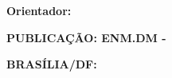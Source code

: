 \begin{folhadeaprovacao}

\thispagestyle{empty}
\setcounter{page}{1}
\begin{center}
	{\normalsize \textbf{
		\MakeUppercase\imprimirinstituicao\\
		\MakeUppercase\imprimirfaculdade\\
		\MakeUppercase\imprimirdepartamento}}
	
	\vfill
	
	{\large \textbf{\MakeUppercase\imprimirtitulo}}
		
	\vfill
	
	{\large \textbf{\imprimirautor}}
	
	\vspace{20mm}
	
	{\normalsize \textbf{Orientador: \imprimirorientador}}
	
	\vspace{20mm}
	
	{\normalsize \textbf{\MakeUppercase\imprimirtipotrabalho}}
	
	\vspace{10mm}
	
	{\normalsize \textbf{PUBLICA\c{C}\~{A}O: ENM.DM - \imprimircdu}}
	
	
	\vspace{10mm}
	
	{\normalsize \textbf{BRASÍLIA/DF: \imprimirdata}}
\end{center}

\pagebreak

%

\begin{center}
	{\normalsize \textbf{\MakeUppercase\imprimirinstituicao}}\\
	{\normalsize \textbf{\MakeUppercase\imprimirfaculdade}}\\
	{\normalsize \textbf{\MakeUppercase\imprimirdepartamento}}\\
	
	\vspace{10mm}
	{\large \textbf{\imprimirtitulo}}
	

\end{center}
\end{folhadeaprovacao}
